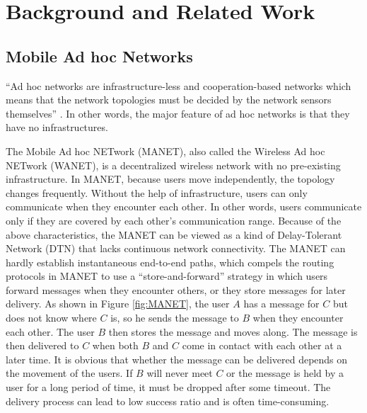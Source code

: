 \chapter {Background and Related Work}
\label{BRW}
\section{ Mobile Ad hoc Networks}
\noindent ``Ad hoc networks are infrastructure-less and cooperation-based networks which means that the network topologies must be decided by the network sensors themselves'' \cite {C14}. In other words, the major feature of ad hoc networks is that they have no infrastructures.

The Mobile Ad hoc NETwork (MANET), also called the Wireless Ad hoc NETwork (WANET), is a decentralized wireless network with no pre-existing infrastructure. In MANET, because users move independently, the topology changes frequently. Without the help of infrastructure, users can only communicate when they encounter each other. In other words, users communicate only if they are covered by each other's communication range. Because of the above characteristics, the MANET can be viewed as a kind of Delay-Tolerant Network (DTN) that lacks continuous network connectivity. The MANET can hardly establish instantaneous end-to-end paths, which compels the routing protocols in MANET to use a ``store-and-forward'' strategy in which users forward messages when they encounter others, or they store messages for later delivery. As shown in Figure \ref{fig:MANET}, the user $A$ has a message for $C$ but does not know where $C$ is, so he sends the message to $B$ when they encounter each other. The user $B$ then stores the message and moves along. The message is then delivered to $C$ when both $B$ and $C$ come in contact with each other at a later time. It is obvious that whether the message can be delivered depends on the movement of the users. If $B$ will never meet $C$ or the message is held by a user for a long period of time, it must be dropped after some timeout. The delivery process can lead to low success ratio and is often time-consuming.

